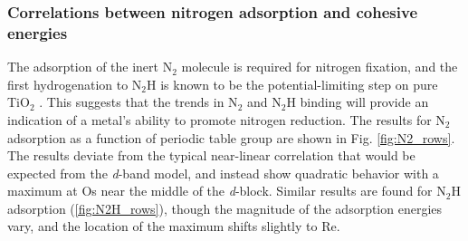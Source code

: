

\subsubsection{Correlations between nitrogen adsorption and cohesive energies}

The adsorption of the inert N$_2$ molecule is required for nitrogen fixation, and the first hydrogenation to N$_2$H is known to be the potential-limiting step on pure TiO$_2$ \cite{Comer_2018}. This suggests that the trends in N$_2$ and N$_2$H binding will provide an indication of a metal's ability to promote nitrogen reduction. The results for N$_2$ adsorption as a function of periodic table group are shown in Fig. \ref{fig:N2_rows}. The results deviate from the typical near-linear correlation that would be expected from the \textit{d}-band model, and instead show quadratic behavior with a maximum at Os near the middle of the \textit{d}-block. Similar results are found for N$_2$H adsorption (\ref{fig:N2H_rows}), though the magnitude of the adsorption energies vary, and the location of the maximum shifts slightly to Re. 

